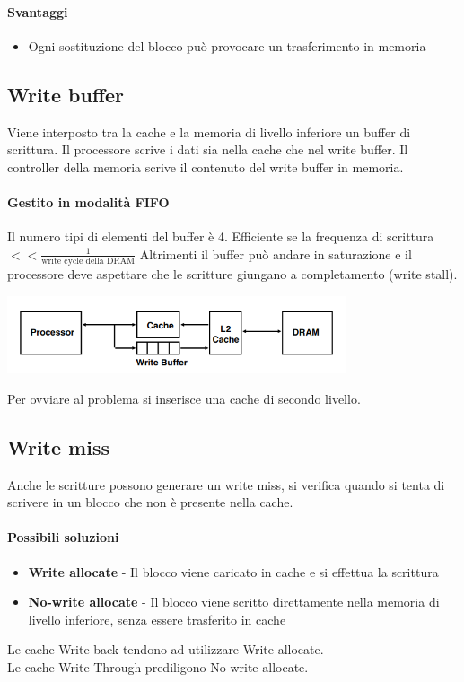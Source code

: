 \documentclass[12pt, a4paper, openany]{book}
\begin{document}
\paragraph*{Svantaggi}
\begin{itemize}
    \item Ogni sostituzione del blocco può provocare un trasferimento in memoria
\end{itemize}

\subsection*{Write buffer} Viene interposto tra la cache e la memoria di livello inferiore un
buffer di scrittura.
Il processore scrive i dati sia nella cache che nel write buffer. Il controller della memoria
scrive il contenuto del write buffer in memoria.
\paragraph*{Gestito in modalità FIFO} Il numero tipi di elementi del buffer è 4.
Efficiente se la frequenza di scrittura $<< \frac{1}{\mbox{write cycle della DRAM}}$
Altrimenti il buffer può andare in saturazione e il processore deve aspettare che le 
scritture giungano a completamento (write stall).
\begin{center}
    \includegraphics[width=100mm, scale=0.5]{Write buffer cache.png}
\end{center}
Per ovviare al problema si inserisce una cache di secondo livello.

\subsection{Write miss}
Anche le scritture possono generare un write miss, si verifica quando si tenta di scrivere
in un blocco che non è presente nella cache.
\paragraph*{Possibili soluzioni}
\begin{itemize}
    \item \textbf{Write allocate} - Il blocco viene caricato in cache e si effettua la scrittura
    \item \textbf{No-write allocate} - Il blocco viene scritto direttamente nella memoria di
    livello inferiore, senza essere trasferito in cache
\end{itemize}
Le cache Write back tendono ad utilizzare Write allocate.
\\ Le cache Write-Through prediligono No-write allocate.
\end{document}

